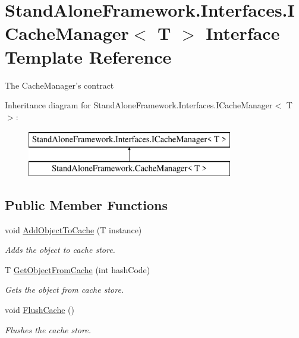 \hypertarget{interface_stand_alone_framework_1_1_interfaces_1_1_i_cache_manager_3_01_t_01_4}{\section{Stand\+Alone\+Framework.\+Interfaces.\+I\+Cache\+Manager$<$ T $>$ Interface Template Reference}
\label{interface_stand_alone_framework_1_1_interfaces_1_1_i_cache_manager_3_01_t_01_4}
}


The Cache\+Manager's contract  


Inheritance diagram for Stand\+Alone\+Framework.\+Interfaces.\+I\+Cache\+Manager$<$ T $>$\+:\begin{figure}[H]
\begin{center}
\leavevmode
\includegraphics[height=2.000000cm]{interface_stand_alone_framework_1_1_interfaces_1_1_i_cache_manager_3_01_t_01_4}
\end{center}
\end{figure}
\subsection*{Public Member Functions}
\begin{DoxyCompactItemize}
\item 
void \hyperlink{interface_stand_alone_framework_1_1_interfaces_1_1_i_cache_manager_3_01_t_01_4_ad0c1608fcc47c31a0afa49f41d516cb4}{Add\+Object\+To\+Cache} (T instance)
\begin{DoxyCompactList}\small\item\em Adds the object to cache store. \end{DoxyCompactList}\item 
T \hyperlink{interface_stand_alone_framework_1_1_interfaces_1_1_i_cache_manager_3_01_t_01_4_ab9c4fc7d4950da75c9bddd22634bd1f3}{Get\+Object\+From\+Cache} (int hash\+Code)
\begin{DoxyCompactList}\small\item\em Gets the object from cache store. \end{DoxyCompactList}\item 
void \hyperlink{interface_stand_alone_framework_1_1_interfaces_1_1_i_cache_manager_3_01_t_01_4_aaedd6cf3b69897bac84bf4ddbad1fdb4}{Flush\+Cache} ()
\begin{DoxyCompactList}\small\item\em Flushes the cache store. \end{DoxyCompactList}\end{DoxyCompactItemize}



